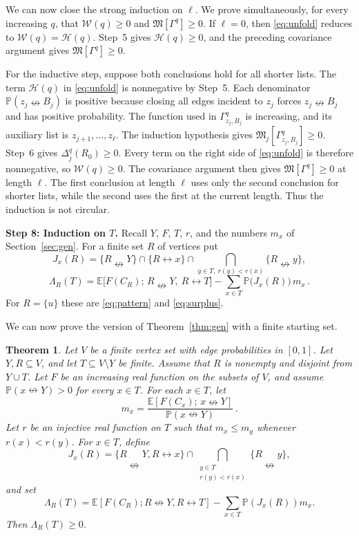 \documentclass[11pt]{article}
\newtheorem{theorem}{Theorem}[section]
\theoremstyle{definition}
\theoremstyle{remark}
\newcommand{\PP}{\mathbb P}
\newcommand{\EE}{\mathbb E}
\newcommand{\con}{\leftrightarrow}
\newcommand{\ncon}{\nleftrightarrow}
\newcommand{\Marg}{\mathfrak M}
\begin{document}
We can now close the strong induction on $\ell$. We prove simultaneously, for every
increasing $q$, that $\mathcal W(q)\geq0$ and $\Marg[\Gamma^q]\geq0$. If $\ell=0$, then
\eqref{eq:unfold} reduces to $\mathcal W(q)=\mathcal H(q)$. Step~5 gives
$\mathcal H(q)\geq0$, and the preceding covariance argument gives
$\Marg[\Gamma^q]\geq0$.

For the inductive step, suppose both conclusions hold for all shorter lists. The term
$\mathcal H(q)$ in \eqref{eq:unfold} is nonnegative by Step~5. Each denominator
$\PP(z_j\ncon B_j)$ is positive because closing all edges incident to $z_j$ forces
$z_j\ncon B_j$ and has positive probability. The function used in
$\Gamma^q_{z_j,B_j}$ is increasing, and its auxiliary list is
$z_{j+1},\ldots,z_\ell$. The induction hypothesis gives
$\Marg_j[\Gamma^q_{z_j,B_j}]\geq0$. Step~6 gives $\Delta^q_j(R_0)\geq0$. Every term on the
right side of \eqref{eq:unfold} is therefore nonnegative, so $\mathcal W(q)\geq0$. The
covariance argument then gives $\Marg[\Gamma^q]\geq0$ at length $\ell$. The first conclusion
at length $\ell$ uses only the second conclusion for shorter lists, while the second uses
the first at the current length. Thus the induction is not circular.

\medskip\noindent\textbf{Step 8: Induction on $T$.}
Recall $Y$, $F$, $T$, $r$, and the numbers $m_x$ of Section~\ref{sec:gen}. For a finite set
$R$ of vertices put
\[
 J_x(R)=\{R\ncon Y\}\cap\{R\con x\}\cap\bigcap_{y\in T,\ r(y)<r(x)}\{R\ncon y\},
\]
\[
 \Lambda_R(T)=\EE\bigl[F(C_R);\,R\ncon Y,\ R\con T\bigr]
 -\sum_{x\in T}\PP\bigl(J_x(R)\bigr)\,m_x\,.
\]
For $R=\{u\}$ these are \eqref{eq:pattern} and \eqref{eq:surplus}.

We can now prove the version of Theorem~\ref{thm:gen} with a finite starting set.

\begin{theorem}\label{thm:pairgen}
Let $V$ be a finite vertex set with edge probabilities in $[0,1]$. Let $Y,R\subseteq V$,
and let $T\subseteq V\setminus Y$ be finite. Assume that $R$ is nonempty and disjoint from
$Y\cup T$. Let $F$ be an increasing real function on the subsets of $V$, and assume
$\PP(x\ncon Y)>0$ for every $x\in T$. For each $x\in T$, let
\[
 m_x=\frac{\EE[F(C_x);\,x\ncon Y]}{\PP(x\ncon Y)}\,.
\]
Let $r$ be an injective real function on $T$ such that $m_x\leq m_y$ whenever
$r(x)<r(y)$. For $x\in T$, define
\[
 J_x(R)=\{R\ncon Y,R\con x\}\cap
 \bigcap_{\substack{y\in T\\r(y)<r(x)}}\{R\ncon y\},
\]
and set
\[
 \Lambda_R(T)=\EE[F(C_R);R\ncon Y,R\con T]
 -\sum_{x\in T}\PP(J_x(R))m_x.
\]
Then $\Lambda_R(T)\geq0$.
\end{theorem}
\end{document}
